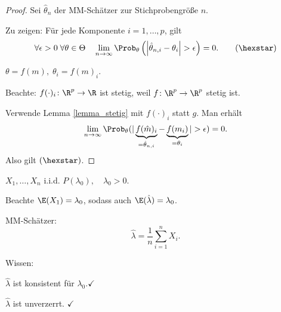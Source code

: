 \documentclass{tstextbook}
\begin{document}
\begin{proof}
	Sei $ \hat{\theta}_n $ der MM-Schätzer zur Stichprobengröße $ n $. 
	
	Zu zeigen: Für jede Komponente $ i = 1, \ldots, p $, gilt 
	\[ \forall \epsilon > 0 \; \forall \theta \in \Theta \quad \lim_{n\to \infty} \Prob_\theta \left( \left| \hat{\theta}_{n,i} - \theta_i \right| > \epsilon \right) = 0. \tag{$\hexstar$} \]
	
	$ \theta = f(m), \; \theta_i = f(m)_i $.
	
	Beachte: $ f(\cdot)_i \colon \R^p \rightarrow \R $ ist stetig, weil $ f \colon \R^p \rightarrow \R^p $ stetig ist. 
	
	Verwende Lemma \ref{lemma_stetig} mit $ f(\cdot)_i $ statt $ g $. Man erhält 
	\[
	\lim_{n\to \infty} \Prob_\theta (| \underbrace{f(\hat{m})_i}_{=\hat{\theta}_{n,i}} - \underbrace{f(m_i)}_{=\theta_{i}} | > \epsilon ) = 0.
	\]
	Also gilt $ (\hexstar) $.
\end{proof}


\begin{example}[Poissonverteilung]
	
	
	$ X_1, \ldots, X_n $ i.i.d. $ P(\lambda_0), \quad \lambda_0 > 0 $. 
	
	Beachte $ \E(X_1) = \lambda_0 $, sodass auch $ \E(\hat{\lambda}) = \lambda_0 $.
	
	MM-Schätzer: \[ \hat{\lambda} = \frac{1}{n} \sum_{i=1}^{n} X_i. \]
	
	Wissen: 
	
	$ \hat{\lambda} $ ist konsistent für $ \lambda_0. \checkmark $
	
	$ \hat{\lambda} $ ist unverzerrt. $ \checkmark $
\end{example}
\end{document}
